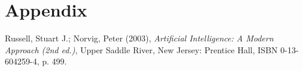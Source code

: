 \documentclass[english,11pt]{article}
\numberwithin{equation}{section}
\begin{document}
\section{Appendix}

\clearpage
\begin{thebibliography}{9}

        Russell, Stuart J.; Norvig, Peter (2003),
        \emph{Artificial Intelligence: A Modern Approach (2nd ed.)},
        Upper Saddle River, New Jersey: Prentice Hall,
        ISBN 0-13-604259-4, p. 499.

\end{thebibliography}
\end{document}
